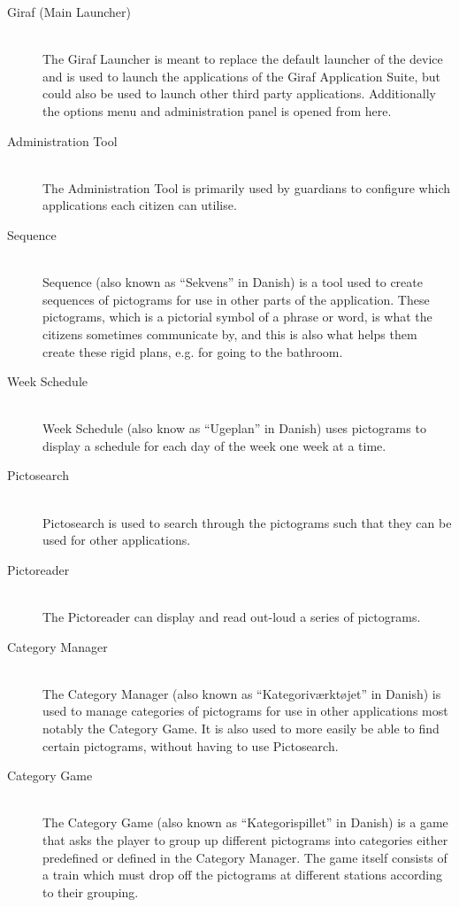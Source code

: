 \begin{description}
	\item[Giraf (Main Launcher)]\hfill \\
	The Giraf Launcher is meant to replace the default launcher of the device and is used to launch the applications of the Giraf Application Suite, but could also be used to launch other third party applications.
	Additionally the options menu and administration panel is opened from here. 
	\item[Administration Tool]\hfill \\
	The Administration Tool is primarily used by guardians to configure which applications each citizen can utilise. 
	\item[Sequence] \hfill \\
	Sequence (also known as ``Sekvens'' in Danish) is a tool used to create sequences of pictograms for use in other parts of the application.
	These pictograms, which is a pictorial symbol of a phrase or word, is what the citizens sometimes communicate by, and this is also what helps them create these rigid plans, e.g. for going to the bathroom. 
	\item[Week Schedule] \hfill \\
	Week Schedule (also know as ``Ugeplan'' in Danish) uses pictograms to display a schedule for each day of the week one week at a time. 
	\item[Pictosearch] \hfill \\
	Pictosearch is used to search through the pictograms such that they can be used for other applications. 
	\item[Pictoreader] \hfill \\
	The Pictoreader can display and read out-loud a series of pictograms. 
	\item[Category Manager] \hfill \\
	The Category Manager (also known as ``Kategoriværktøjet'' in Danish) is used to manage categories of pictograms for use in other applications most notably the Category Game.
	It is also used to more easily be able to find certain pictograms, without having to use Pictosearch.
	\item[Category Game] \hfill \\
	The Category Game (also known as ``Kategorispillet'' in Danish) is a game that asks the player to group up different pictograms into categories either predefined or defined in the Category Manager. 
	The game itself consists of a train which must drop off the pictograms at different stations according to their grouping.

\end{description}
